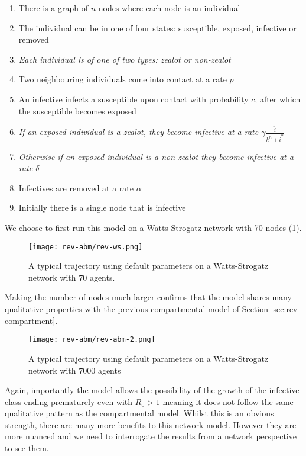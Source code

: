 \begin{enumerate}[nosep]
	\item There is a graph of $n$ nodes where each node is an individual
	\item The individual can be in one of four states: susceptible, exposed, infective or removed
	\item \textit{Each individual is of one of two types: zealot or non-zealot}
	\item Two neighbouring individuals come into contact at a rate $p$
	\item An infective infects a susceptible upon contact with probability $c$, after which the susceptible becomes exposed
	\item \textit{If an exposed individual is a zealot, they become infective at a rate $\gamma \frac{\hat i}{k^n+\hat i^n}$}
	\item \textit{Otherwise if an exposed individual is a non-zealot they become infective at a rate $\delta$}
	\item Infectives are removed at a rate $\alpha$
	\item Initially there is a single node that is infective
\end{enumerate}
\bigskip
We choose to first run this model on a Watts-Strogatz network with 70 nodes (\ref{fig:abm-rev-70}). 
\begin{figure}[h]
	\centering
	\texttt{[image: rev-abm/rev-ws.png]}
	\caption{A typical trajectory using default parameters on a Watts-Strogatz network with $70$ agents.}
	\label{fig:abm-rev-70}
\end{figure}
Making the number of nodes much larger confirms that the model shares many qualitative properties with the previous compartmental model of Section \ref{sec:rev-compartment}.
\begin{figure}[h]
	\centering
	\texttt{[image: rev-abm/rev-abm-2.png]}
	\caption{A typical trajectory using default parameters on a Watts-Strogatz network with $7000$ agents}
	\label{fig:abm-rev-7000}
\end{figure}
Again, importantly the model allows the possibility of the growth of the infective class ending prematurely even with $R_0>1$ meaning it does not follow the same qualitative pattern as the compartmental model. Whilst this is an obvious strength, there are many more benefits to this network model. However they are more nuanced and we need to interrogate the results from a network perspective to see them.
